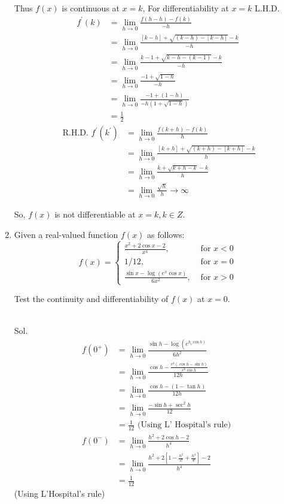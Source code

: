 \begin{enumerate}
\begin{outline}
Thus $f(x)$ is continuous at $x=k$,
For differentiability at $x=k$
L.H.D.
$$
\begin{aligned}
f^{\prime}(k) & =\lim _{h \rightarrow 0} \frac{f(h-h)-f(k)}{-h} \\
& =\lim _{h \rightarrow 0} \frac{[k-h]+\sqrt{(k-h)-[k-h]}-k}{-h} \\
& =\lim _{h \rightarrow 0} \frac{k-1+\sqrt{k-h-(k-1)}-k}{-h} \\
& =\lim _{h \rightarrow 0} \frac{-1+\sqrt{1-h}}{-h} \\
& =\lim _{h \rightarrow 0} \frac{-1+(1-h)}{-h(1+\sqrt{1-h})} \\
& =\frac{1}{2}
\end{aligned}
$$
$$
\begin{aligned}
\text { R.H.D. } f^{\prime}\left(k^{\prime}\right) & =\lim _{h \rightarrow 0} \frac{f(k+h)-f(k)}{h} \\
& =\lim _{h \rightarrow 0} \frac{[k+h]+\sqrt{(k+h)-[k+h]}-k}{h} \\
& =\lim _{h \rightarrow 0} \frac{k+\sqrt{k+h-k}-k}{h} \\
& =\lim _{h \rightarrow 0} \frac{\sqrt{h}}{h} \rightarrow \infty
\end{aligned}
$$

So, $f(x)$ is not differentiable at $x=k, k \in Z$.
\end{outline}


\item Given a real-valued function $f(x)$ as follows:
$$
f(x)= \begin{cases}\frac{x^2+2 \cos x-2}{x^4}, & \text { for } x<0 \\ 1 / 12, & \text { for } x=0 \\ \frac{\sin x-\log \left(e^x \cos x\right)}{6 x^2}, & \text { for } x>0\end{cases}
$$

Test the continuity and differentiability of $f(x)$ at $x=0$.\\\\


\begin{outline}
    Sol.
$$
\begin{aligned}
f\left(0^{+}\right) & =\lim _{h \rightarrow 0} \frac{\sin h-\log \left(e^{\left.h_i \cos h\right)}\right.}{6 h^2} \\
& =\lim _{h \rightarrow 0} \frac{\cos h-\frac{e^h(\cos h-\sin h)}{e^h \cos h}}{12 h} \\
& =\lim _{h \rightarrow 0} \frac{\cos h-(1-\tan h)}{12 h} \\
& =\lim _{h \rightarrow 0} \frac{-\sin h+\sec ^2 h}{12} \\
& =\frac{1}{12} \text { (Using L' Hospital's rule) } \\
f\left(0^{-}\right) & =\lim _{h \rightarrow 0} \frac{h^2+2 \cos h-2}{h^4} \\
& =\lim _{h \rightarrow 0} \frac{h^2+2\left[1-\frac{h^2}{2 !}+\frac{h^4}{4 !}\right]-2}{h^4} \\
& =\frac{1}{12}
\end{aligned}
$$
(Using L'Hospital's rule)


\end{outline}
\end{enumerate}
